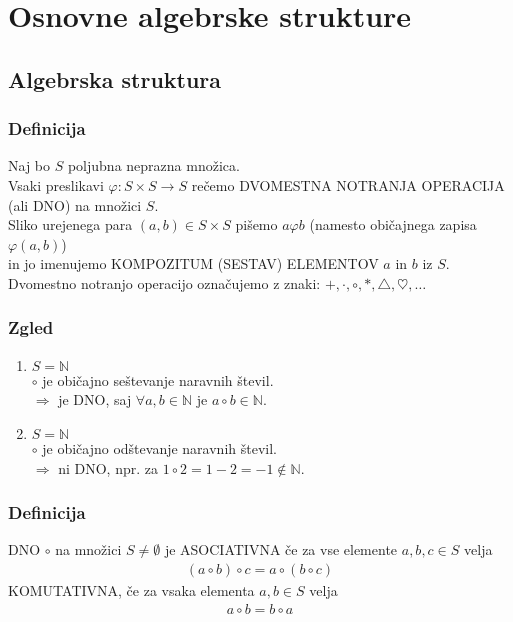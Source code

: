 \section{Osnovne algebrske strukture}

\subsection{Algebrska struktura}

\subsubsection{Definicija}
Naj bo $S$ poljubna neprazna množica. \\
Vsaki preslikavi $\varphi : S \times S \to S$ rečemo DVOMESTNA NOTRANJA OPERACIJA \\ (ali DNO) na množici $S$. \\[1em]
Sliko urejenega para $(a, b) \in S \times S$ pišemo $a\varphi b$ (namesto običajnega zapisa $\varphi(a, b)$) \\ in jo imenujemo KOMPOZITUM (SESTAV) ELEMENTOV $a$ in $b$ iz $S$. \\[1em]
Dvomestno notranjo operacijo označujemo z znaki: $+, \cdot, \circ, *,\triangle, \heartsuit, \dots$

\subsubsection{Zgled}
\begin{enumerate}[label=\alph*)]
    \item $S = \mathbb{N}$ \\ $\circ$ je običajno seštevanje naravnih števil. \\ $\Rightarrow$ je DNO, saj $\forall a, b \in \mathbb{N}$ je $a \circ b \in \mathbb{N}$.
    \item $S = \mathbb{N}$ \\ $\circ$ je običajno odštevanje naravnih števil. \\ $\Rightarrow$ ni DNO, npr. za $1 \circ 2 = 1 - 2 = -1 \notin \mathbb{N}$.
\end{enumerate}

\subsubsection{Definicija}
DNO $\circ$ na množici $S \ne \emptyset$ je ASOCIATIVNA če za vse elemente $a, b, c \in S$ velja
\begin{align*}
    (a \circ b) \circ c = a \circ (b \circ c)
\end{align*}
KOMUTATIVNA, če za vsaka elementa $a, b \in S$ velja
\begin{align*}
    a \circ b = b \circ a
\end{align*}

